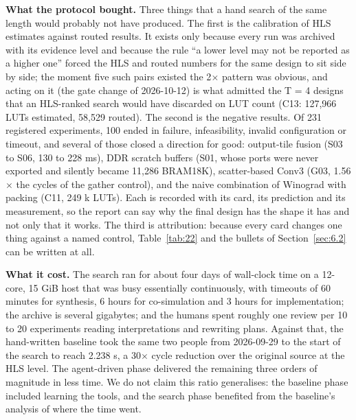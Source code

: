 \textbf{What the protocol bought.} Three things that a hand search of the same length would probably not have produced. The first is the calibration of HLS estimates against routed results. It exists only because every run was archived with its evidence level and because the rule ``a lower level may not be reported as a higher one'' forced the HLS and routed numbers for the same design to sit side by side; the moment five such pairs existed the 2$\times$ pattern was obvious, and acting on it (the gate change of 2026-10-12) is what admitted the T = 4 designs that an HLS-ranked search would have discarded on LUT count (C13: 127,966 LUTs estimated, 58,529 routed). The second is the negative results. Of 231 registered experiments, 100 ended in failure, infeasibility, invalid configuration or timeout, and several of those closed a direction for good: output-tile fusion (S03 to S06, 130 to 228 ms), DDR scratch buffers (S01, whose ports were never exported and silently became 11,286 BRAM18K), scatter-based Conv3 (G03, 1.56$\times$ the cycles of the gather control), and the naive combination of Winograd with packing (C11, 249 k LUTs). Each is recorded with its card, its prediction and its measurement, so the report can say why the final design has the shape it has and not only that it works. The third is attribution: because every card changes one thing against a named control, Table~\ref{tab:22} and the bullets of Section~\ref{sec:6.2} can be written at all.

\textbf{What it cost.} The search ran for about four days of wall-clock time on a 12-core, 15 GiB host that was busy essentially continuously, with timeouts of 60 minutes for synthesis, 6 hours for co-simulation and 3 hours for implementation; the archive is several gigabytes; and the humans spent roughly one review per 10 to 20 experiments reading interpretations and rewriting plans. Against that, the hand-written baseline took the same two people from 2026-09-29 to the start of the search to reach 2.238 s, a 30$\times$ cycle reduction over the original source at the HLS level. The agent-driven phase delivered the remaining three orders of magnitude in less time. We do not claim this ratio generalises: the baseline phase included learning the tools, and the search phase benefited from the baseline's analysis of where the time went.

